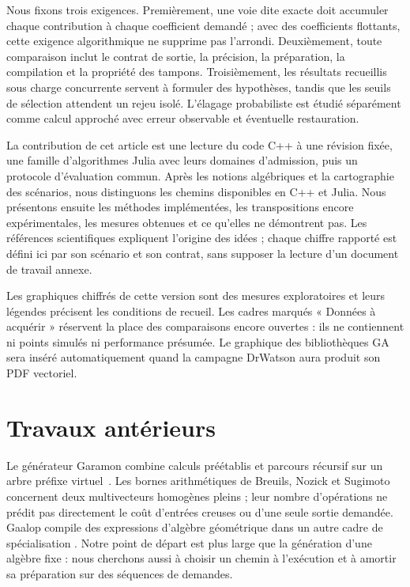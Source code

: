 \documentclass[11pt,a4paper]{article}
\begin{document}
Nous fixons trois exigences. Premièrement, une voie dite exacte doit
accumuler chaque contribution à chaque coefficient demandé ; avec des
coefficients flottants, cette exigence algorithmique ne supprime pas
l'arrondi. Deuxièmement, toute comparaison inclut le contrat de sortie,
la précision, la préparation, la compilation et la propriété des tampons.
Troisièmement, les résultats recueillis sous charge concurrente servent à
formuler des hypothèses, tandis que les seuils de sélection attendent un
rejeu isolé. L'élagage probabiliste est étudié séparément comme calcul
approché avec erreur observable et éventuelle restauration.

La contribution de cet article est une lecture du code C++ à une révision
fixée, une famille d'algorithmes Julia avec leurs domaines d'admission, puis
un protocole d'évaluation commun. Après les notions algébriques et la
cartographie des scénarios, nous distinguons les chemins disponibles en
C++ et Julia. Nous présentons ensuite les méthodes implémentées, les
transpositions encore expérimentales, les mesures obtenues et ce qu'elles
ne démontrent pas. Les références scientifiques expliquent l'origine des
idées ; chaque chiffre rapporté est défini ici par son scénario et son
contrat, sans supposer la lecture d'un document de travail annexe.

Les graphiques chiffrés de cette version sont des mesures exploratoires
et leurs légendes précisent les conditions de recueil. Les cadres marqués
« Données à acquérir » réservent la place des comparaisons encore ouvertes :
ils ne contiennent ni points simulés ni performance présumée. Le graphique
des bibliothèques GA sera inséré automatiquement quand la campagne
DrWatson aura produit son PDF vectoriel.

\section{Travaux antérieurs}
Le générateur Garamon combine calculs préétablis et parcours récursif sur un
arbre préfixe virtuel~\cite{breuils2019,garamoncpp}. Les bornes arithmétiques
de Breuils, Nozick et Sugimoto concernent deux multivecteurs homogènes pleins
\cite{breuils2020} ; leur nombre d'opérations ne prédit pas directement le
coût d'entrées creuses ou d'une seule sortie demandée. Gaalop compile des
expressions d'algèbre géométrique dans un autre cadre de spécialisation
\cite{gaalop}. Notre point de départ est plus large que la génération
d'une algèbre fixe : nous cherchons aussi à choisir un chemin à l'exécution
et à amortir sa préparation sur des séquences de demandes.
\end{document}

